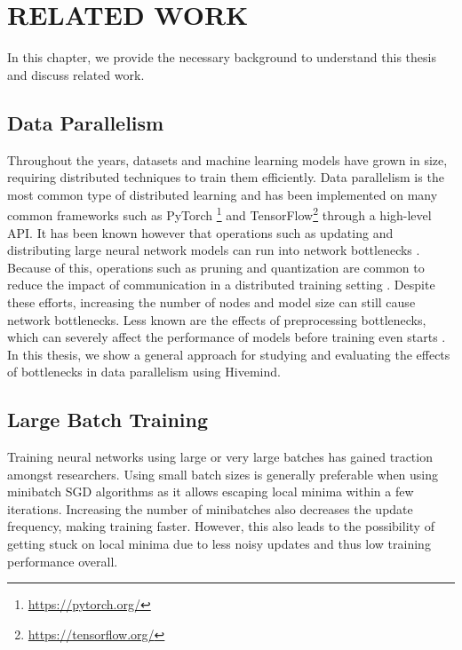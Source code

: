 \chapter{RELATED WORK}\label{chapter:related-work}
In this chapter, we provide the necessary background to understand this thesis and discuss related work.

\section{Data Parallelism}
Throughout the years, datasets and machine learning models have grown in size, requiring distributed techniques to train them efficiently.
Data parallelism is the most common type of distributed learning and has been implemented on many common frameworks such as PyTorch \footnote{\href{https://pytorch.org/}{https://pytorch.org/}} and TensorFlow\footnote{\href{https://tensorflow.org/}{https://tensorflow.org/}} through a high-level API.
It has been known however that operations such as updating and distributing large neural network models can run into network bottlenecks \cite{10.48550/arxiv.1705.08741, DBLP:journals/corr/abs-2003-11316, 10.5555/2999134.2999271, DBLP:journals/corr/abs-1811-03600}.
Because of this, operations such as pruning and quantization are common to reduce the impact of communication in a distributed training setting \cite{10.48550/arxiv.2003.03033, 10.48550/arxiv.1510.00149}.
Despite these efforts, increasing the number of nodes and model size can still cause network bottlenecks.
Less known are the effects of preprocessing bottlenecks, which can severely affect the performance of models before training even starts \cite{isenko2022bottleneck, 10.1145/3448016.3457566}.
In this thesis, we show a general approach for studying and evaluating the effects of bottlenecks in data parallelism using Hivemind.

\section{Large Batch Training}
Training neural networks using large or very large batches \cite{DBLP:journals/corr/KeskarMNST16, 10.48550/arxiv.1705.08741} has gained traction amongst researchers.
Using small batch sizes is generally preferable when using minibatch SGD algorithms as it allows escaping local minima within a few iterations.
Increasing the number of minibatches also decreases the update frequency, making training faster.
However, this also leads to the possibility of getting stuck on local minima due to less noisy updates and thus low training performance overall.

